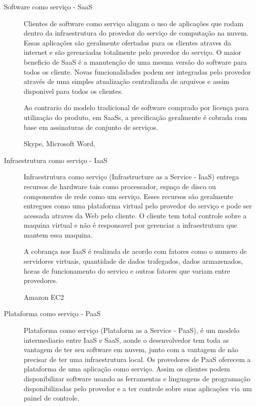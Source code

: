 		\begin{description}
		\item [Software como serviço - SaaS]
		Clientes de software como serviço alugam o uso de aplicações que rodam dentro da infraestrutura do provedor do serviço de computação na nuvem. Essas aplicações são geralmente ofertadas para os clientes atraves da internet e são gerenciadas totalmente pelo provedor do serviço. O maior beneficio de SaaS é a manutenção de uma mesma versão do software para todos os cliente. Novas funcionalidades podem ser integradas pelo provedor através de uma simples atualização centralizada de arquivos e assim disponivel para todos os clientes.

		Ao contrario do modelo tradicional de software comprado por licença para utilização do produto, em SaaSs, a precificação geralmente é cobrada com base em assinaturas de conjunto de serviços.


		Skype, Microsoft Word, 

		\item [Infraestrutura como serviço - IaaS]
		Infraestrutura como serviço (Infrastructure as a Service - IaaS) entrega recursos de hardware tais como processador, espaço de disco ou componentes de rede como um serviço. Esses recursos são geralmente entregues como uma plataforma virtual pelo provedor do serviço e pode ser acessada atraves da Web pelo cliente. O cliente tem total controle sobre a maquina virtual e não é responsavel por gerenciar a infraestrutura que mantem essa maquina.
	
		A cobrança nos IaaS é realizada de acordo com fatores como o numero de servidores virtuais, quantidade de dados trafegados, dados armazenados, horas de funcionamento do servico e outros fatores que variam entre provedores.

		Amazon EC2
	

		\item[Plataforma como serviço - PaaS]
		Plataforma como serviço (Plataform as a Service - PaaS), é um modelo intermediario entre IaaS e SaaS, aonde o desenvolvedor tem toda as vantagem de ter seu software em nuvem, junto com a vantagem de não precisar de ter uma infraestrutura local. Os provedores de PaaS oferecem a plataforma de uma aplicação como serviço. Assim os clientes podem disponibilizar software usando as ferramentas e linguagens de programação disponibilizadas pelo provedor e a ter controle sobre suas aplicações via um painel de controle.


\end{description}
